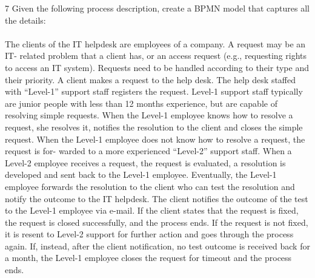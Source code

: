 \begin{exercise}{7}
Given the following process description, create a BPMN model that captures all the details:
\\\\The clients of the IT helpdesk are employees of a company. A request may be an IT-
related problem that a client has, or an access request (e.g., requesting rights to access
an IT system). Requests need to be handled according to their type and their priority.
A client makes a request to the help desk. The help desk staffed with “Level-1” support
staff registers the request. Level-1 support staff typically are junior people with less than
12 months experience, but are capable of resolving simple requests. When the Level-1
employee knows how to resolve a request, she resolves it, notifies the resolution to the
client and closes the simple request.
When the Level-1 employee does not know how to resolve a request, the request is for-
warded to a more experienced “Level-2” support staff. When a Level-2 employee receives
a request, the request is evaluated, a resolution is developed and sent back to the Level-1
employee. Eventually, the Level-1 employee forwards the resolution to the client who
can test the resolution and notify the outcome to the IT helpdesk. The client notifies
the outcome of the test to the Level-1 employee via e-mail. If the client states that the
request is fixed, the request is closed successfully, and the process ends. If the request is
not fixed, it is resent to Level-2 support for further action and goes through the process
again. If, instead, after the client notification, no test outcome is received back for a
month, the Level-1 employee closes the request for timeout and the process ends.
\end{exercise}
